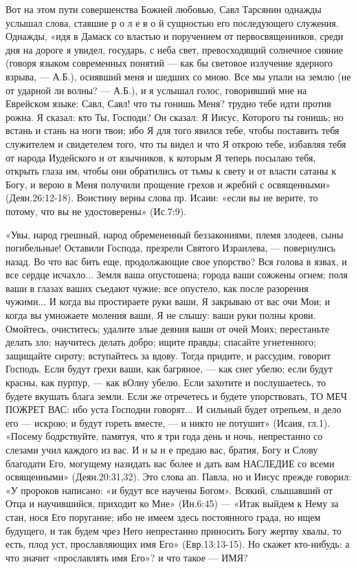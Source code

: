       Вот на этом пути совершенства Божией любовью, Савл Тарсянин однажды услышал слова, ставшие  р о л е в о й  сущностью его последующего служения. Однажды, «идя в Дамаск со властью и поручением от первосвященников, среди дня на дороге я увидел, государь, с неба свет, превосходящий солнечное сияние (говоря языком современных понятий --- как бы световое излучение ядерного взрыва, --- А.Б.), осиявший меня и шедших со мною. Все мы упали на землю (не от ударной ли волны? --- А.Б.), и я услышал голос, говоривший мне на Еврейском языке: Савл, Савл! что ты гонишь Меня?  трудно тебе идти против рожна.  Я сказал: кто Ты, Господи?  Он сказал: Я Иисус, Которого ты гонишь; но встань и стань на ноги твои; ибо Я для того явился тебе, чтобы поставить тебя служителем и свидетелем того, что ты видел и что Я открою тебе, избавляя тебя от народа Иудейского и от язычников, к которым Я теперь посылаю тебя,  открыть глаза им, чтобы они обратились от тьмы к свету и от власти сатаны к Богу, и верою в Меня получили прощение грехов и жребий с освященными» (Деян.26:12-18).
     Воистину верны слова пр. Исаии: «если вы не верите, то потому, что вы не удостоверены» (Ис.7:9).

      «Увы, народ грешный, народ обремененный беззакониями, племя злодеев, сыны погибельные!
Оставили Господа, презрели Святого Израилева, --- повернулись назад. Во что вас бить еще, продолжающие свое упорство? Вся голова в язвах, и все сердце исчахло... Земля ваша опустошена; города ваши сожжены огнем; поля ваши в глазах ваших съедают чужие; все опустело, как после разорения чужими...  И когда вы простираете руки ваши, Я закрываю от вас очи Мои; и когда вы умножаете моления ваши, Я не слышу: ваши руки полны крови.
     Омойтесь, очиститесь; удалите злые деяния ваши от очей Моих; перестаньте делать зло; научитесь делать добро; ищите правды; спасайте угнетенного; защищайте сироту; вступайтесь за вдову.
     Тогда придите, и рассудим, говорит Господь. Если будут грехи ваши, как багряное, --- как снег убелю;  если будут красны, как пурпур, --- как вОлну убелю.      Если захотите и послушаетесь, то будете вкушать блага земли.    Если же отречетесь и будете упорствовать, ТО МЕЧ ПОЖРЕТ ВАС: ибо уста Господни говорят...  И сильный будет отрепьем, и дело его --- искрою;  и будут гореть вместе, --- и никто не потушит» (Исаия, гл.1).
«Посему бодрствуйте, памятуя, что я три года день и ночь, непрестанно со слезами учил каждого из вас. И  н ы н е   предаю вас, братия, Богу и Слову благодати Его, могущему назидать вас более и дать вам  НАСЛЕДИЕ  со всеми освященными» (Деян.20:31,32).    Это слова ап. Павла, но и Иисус прежде говорил: «У пророков написано: «и будут все научены Богом». Всякий, слышавший от Отца и научившийся, приходит ко Мне» (Ин.6:45) --- «Итак выйдем к Нему за стан, нося Его поругание; ибо не имеем здесь постоянного града, но ищем будущего, и так будем чрез Него непрестанно приносить Богу жертву хвалы, то есть, плод уст, прославляющих имя Его» (Евр.13:13-15).
     Но скажет кто-нибудь: а что значит «прославлять имя Его»? и что такое --- ИМЯ?

